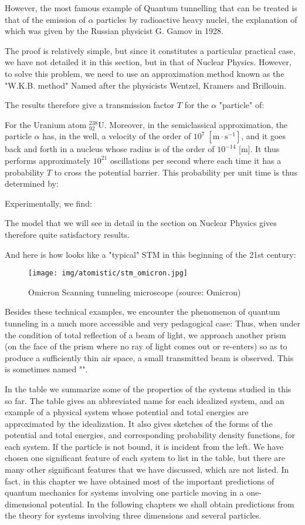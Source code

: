 	However, the most famous example of Quantum tunnelling that can be treated is that of the emission of $\alpha$ particles by radioactive heavy nuclei, the explanation of which was given by the Russian physicist G. Gamov in 1928.

	The proof is relatively simple, but since it constitutes a particular practical case, we have not detailed it in this section, but in that of Nuclear Physics. However, to solve this problem, we need to use an approximation method known as the "W.K.B. method" Named after the physicists Wentzel, Kramers and Brillouin.
	
	The results therefore give a transmission factor $T$ for the $\alpha$ "particle" of:
	
	For the Uranium atom $_{92}^{238}\mathrm{U}$. Moreover, in the semiclassical approximation, the particle $\alpha$ has, in the well, a velocity of the order of $10^7\;[\text{m}\cdot\text{s}^{-1}]$, and it goes back and forth in a nucleus whose radius is of the order of $10^{-14}$ [m]. It thus performs approximately $10^{21}$ oscillations per second where each time it has a probability $T$ to cross the potential barrier. This probability per unit time is thus determined by:
	
	Experimentally, we find:
	
	The model that we will see in detail in the section on Nuclear Physics gives therefore quite satisfactory results.
	
	And here is how looks like  a "typical" STM in this beginning of the 21st century:
	\begin{figure}[H]
		\centering
		\texttt{[image: img/atomistic/stm\_omicron.jpg]}	
		\caption{Omicron Scanning tunneling microscope (source: Omicron)}
	\end{figure}
	Besides these technical examples, we encounter the phenomenon of quantum tunneling in a much more accessible and very pedagogical case: Thus, when under the condition of total reflection of a beam of light, we approach another prism (on the face of the prism where no ray of light comes out or re-enters) so as to produce a sufficiently thin air space, a small transmitted beam is observed. This is sometimes named "".
	
	In the table we summarize some of the properties of the systems studied in this so far. The table gives an abbreviated name for each idealized system, and an example of a physical system whose potential and total energies are approximated by the idealization. It also gives sketches of the forms of the potential and total energies, and corresponding probability density functions, for each system. If the particle is not bound, it is incident from the left. We have chosen one significant feature of each system to list in the table, but there are many other significant features that we have discussed, which are not listed. In fact, in this chapter we have obtained most of the important predictions of quantum mechanics for systems involving one particle moving in a one-dimensional potential. In the following chapters we shall obtain predictions from the theory for systems involving three dimensions and several particles.
	

